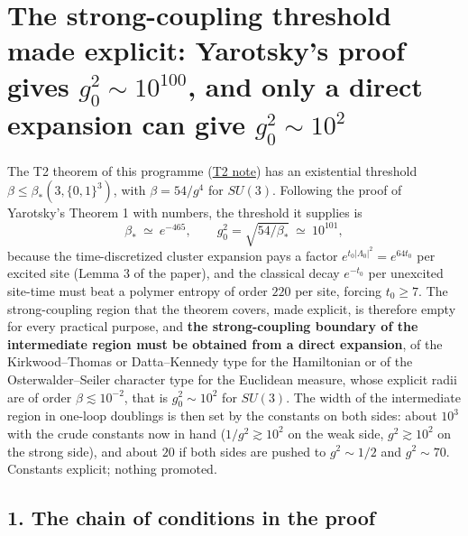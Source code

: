 \documentclass[11pt,a4paper]{article}
\begin{document}
\hypertarget{the-strong-coupling-threshold-made-explicit-yarotskys-proof-gives-g_02sim10100-and-only-a-direct-expansion-can-give-g_02sim102}{%
\section{\texorpdfstring{The strong-coupling threshold made explicit:
Yarotsky's proof gives \(g_0^2\sim10^{100}\), and only a direct
expansion can give
\(g_0^2\sim10^2\)}{The strong-coupling threshold made explicit: Yarotsky's proof gives g\_0\^{}2\textbackslash sim10\^{}\{100\}, and only a direct expansion can give g\_0\^{}2\textbackslash sim10\^{}2}}\label{the-strong-coupling-threshold-made-explicit-yarotskys-proof-gives-g_02sim10100-and-only-a-direct-expansion-can-give-g_02sim102}}

The T2 theorem of this programme
(\href{strong-coupling-uniform-gap.md}{T2 note}) has an existential
threshold \(\beta\le\beta_*(3,\{0,1\}^3)\), with \(\beta=54/g^4\) for
\(SU(3)\). Following the proof of Yarotsky's Theorem 1 with numbers, the
threshold it supplies is
\[\beta_*\ \simeq\ e^{-465},\qquad g_0^2=\sqrt{54/\beta_*}\ \simeq\ 10^{101},\]
because the time-discretized cluster expansion pays a factor
\(e^{t_0|\Lambda_0|^2}=e^{64t_0}\) per excited site (Lemma 3 of the
paper), and the classical decay \(e^{-t_0}\) per unexcited site-time
must beat a polymer entropy of order \(220\) per site, forcing
\(t_0\ge7\). The strong-coupling region that the theorem covers, made
explicit, is therefore empty for every practical purpose, and
\textbf{the strong-coupling boundary of the intermediate region must be
obtained from a direct expansion}, of the Kirkwood--Thomas or
Datta--Kennedy type for the Hamiltonian or of the Osterwalder--Seiler
character type for the Euclidean measure, whose explicit radii are of
order \(\beta\lesssim10^{-2}\), that is \(g_0^2\sim10^2\) for \(SU(3)\).
The width of the intermediate region in one-loop doublings is then set
by the constants on both sides: about \(10^3\) with the crude constants
now in hand (\(1/g^2\gtrsim10^2\) on the weak side, \(g^2\gtrsim10^2\)
on the strong side), and about \(20\) if both sides are pushed to
\(g^2\sim1/2\) and \(g^2\sim70\). Constants explicit; nothing promoted.

\hypertarget{the-chain-of-conditions-in-the-proof}{%
\subsection{1. The chain of conditions in the
proof}\label{the-chain-of-conditions-in-the-proof}}
\end{document}
